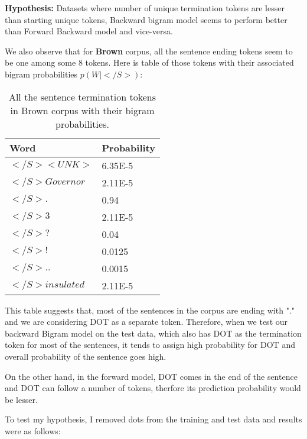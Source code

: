{\bfseries Hypothesis:} Datasets where number of unique termination tokens are lesser than starting unique tokens, Backward bigram model seems to perform better than Forward Backward model and vice-versa.

We also observe that for {\bfseries Brown} corpus, all the sentence ending tokens seem to be one among some 8 tokens. Here is table of those tokens with their associated bigram probabilities $p(W|</S>)$:

\begin{center}	
    \begin{table}[ht]
    \centering
    \begin{tabular}{| l | l | }
    \hline
    Word & Probability \\ \hline
   $</S><UNK>$ & 6.35E-5\\ \hline
   $</S>Governor$ & 2.11E-5 \\ \hline
   $</S>.$ & 0.94 \\ \hline
   $</S>3$ & 2.11E-5  \\ \hline
   $</S>?$ & 0.04  \\ \hline 
   $</S>!$ & 0.0125  \\ \hline 
   $</S>..$ & 0.0015  \\ \hline 
   $</S>insulated$ & 2.11E-5  \\ \hline 
    \end{tabular}
    \caption{All the sentence termination tokens in Brown corpus with their bigram probabilities.}
    \end{table}%
\end{center}

This table suggests that, most of the sentences in the corpus are ending with "." and we are considering DOT as a separate token. Therefore, when we test our backward Bigram model on the test data, which also has DOT as the termination token for most of the sentences, it tends to assign high probability for DOT and overall probability of the sentence goes high. 

On the other hand, in the forward model, DOT comes in the end of the sentence and DOT can follow a number of tokens, therfore its prediction probability would be lesser.

To test my hypothesis, I removed dots from the training and test data and results were as follows:

